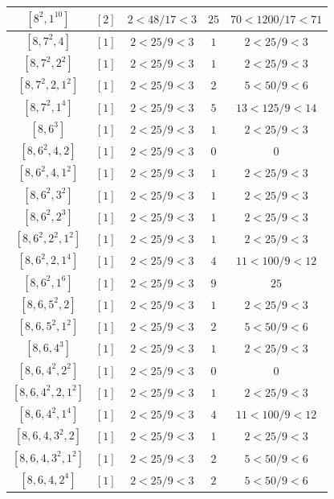 \documentclass{article}%
\begin{document}
\begin{center}
\begin{longtable}{||c|c|c|c|c||}
$[8^{2}, 1^{10}]$ & $[2]$ & $2 < 48/17 < 3$ & $25$ & $70 < 1200/17 < 71$ \\ \hline 
$[8, 7^{2}, 4]$ & $[1]$ & $2 < 25/9 < 3$ & $1$ & $2 < 25/9 < 3$ \\ \hline 
$[8, 7^{2}, 2^{2}]$ & $[1]$ & $2 < 25/9 < 3$ & $1$ & $2 < 25/9 < 3$ \\ \hline 
$[8, 7^{2}, 2, 1^{2}]$ & $[1]$ & $2 < 25/9 < 3$ & $2$ & $5 < 50/9 < 6$ \\ \hline 
$[8, 7^{2}, 1^{4}]$ & $[1]$ & $2 < 25/9 < 3$ & $5$ & $13 < 125/9 < 14$ \\ \hline 
$[8, 6^{3}]$ & $[1]$ & $2 < 25/9 < 3$ & $1$ & $2 < 25/9 < 3$ \\ \hline 
$[8, 6^{2}, 4, 2]$ & $[1]$ & $2 < 25/9 < 3$ & $0$ & $0$ \\ \hline 
$[8, 6^{2}, 4, 1^{2}]$ & $[1]$ & $2 < 25/9 < 3$ & $1$ & $2 < 25/9 < 3$ \\ \hline 
$[8, 6^{2}, 3^{2}]$ & $[1]$ & $2 < 25/9 < 3$ & $1$ & $2 < 25/9 < 3$ \\ \hline 
$[8, 6^{2}, 2^{3}]$ & $[1]$ & $2 < 25/9 < 3$ & $1$ & $2 < 25/9 < 3$ \\ \hline 
$[8, 6^{2}, 2^{2}, 1^{2}]$ & $[1]$ & $2 < 25/9 < 3$ & $1$ & $2 < 25/9 < 3$ \\ \hline 
$[8, 6^{2}, 2, 1^{4}]$ & $[1]$ & $2 < 25/9 < 3$ & $4$ & $11 < 100/9 < 12$ \\ \hline 
$[8, 6^{2}, 1^{6}]$ & $[1]$ & $2 < 25/9 < 3$ & $9$ & $25$ \\ \hline 
$[8, 6, 5^{2}, 2]$ & $[1]$ & $2 < 25/9 < 3$ & $1$ & $2 < 25/9 < 3$ \\ \hline 
$[8, 6, 5^{2}, 1^{2}]$ & $[1]$ & $2 < 25/9 < 3$ & $2$ & $5 < 50/9 < 6$ \\ \hline 
$[8, 6, 4^{3}]$ & $[1]$ & $2 < 25/9 < 3$ & $1$ & $2 < 25/9 < 3$ \\ \hline 
$[8, 6, 4^{2}, 2^{2}]$ & $[1]$ & $2 < 25/9 < 3$ & $0$ & $0$ \\ \hline 
$[8, 6, 4^{2}, 2, 1^{2}]$ & $[1]$ & $2 < 25/9 < 3$ & $1$ & $2 < 25/9 < 3$ \\ \hline 
$[8, 6, 4^{2}, 1^{4}]$ & $[1]$ & $2 < 25/9 < 3$ & $4$ & $11 < 100/9 < 12$ \\ \hline 
$[8, 6, 4, 3^{2}, 2]$ & $[1]$ & $2 < 25/9 < 3$ & $1$ & $2 < 25/9 < 3$ \\ \hline 
$[8, 6, 4, 3^{2}, 1^{2}]$ & $[1]$ & $2 < 25/9 < 3$ & $2$ & $5 < 50/9 < 6$ \\ \hline 
$[8, 6, 4, 2^{4}]$ & $[1]$ & $2 < 25/9 < 3$ & $2$ & $5 < 50/9 < 6$ \\ \hline 

\end{longtable}
\end{center}
\end{document}
